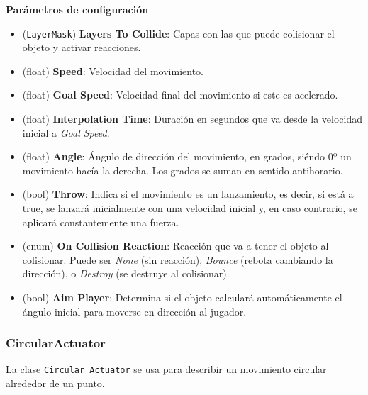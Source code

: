 \textbf{Parámetros de configuración}
\begin{itemize}
	\item (\texttt{LayerMask}) \textbf{Layers To Collide}: Capas con las que puede colisionar el objeto y activar reacciones.
	\item (float) \textbf{Speed}: Velocidad del movimiento.
	\item (float) \textbf{Goal Speed}: Velocidad final del movimiento si este es acelerado.
	\item (float) \textbf{Interpolation Time}: Duración en segundos que va desde la velocidad inicial a \textit{Goal Speed}.
	\item (float) \textbf{Angle}: Ángulo de dirección del movimiento, en grados, siéndo 0º un movimiento hacía la derecha. Los grados se suman en sentido antihorario.
	\item (bool) \textbf{Throw}: Indica si el movimiento es un lanzamiento, es decir, si está a true, se lanzará inicialmente con una velocidad inicial y, en caso contrario, se aplicará constantemente una fuerza.
	\item (enum) \textbf{On Collision Reaction}: Reacción que va a tener el objeto al colisionar. Puede ser \textit{None} (sin reacción), \textit{Bounce} (rebota cambiando la dirección), o \textit{Destroy} (se destruye al colisionar).
	\item (bool) \textbf{Aim Player}: Determina si el objeto calculará automáticamente el ángulo inicial para moverse en dirección al jugador.
\end{itemize}

\subsubsection{CircularActuator}
La clase \texttt{Circular Actuator} se usa para describir un movimiento circular alrededor de un punto.\\


